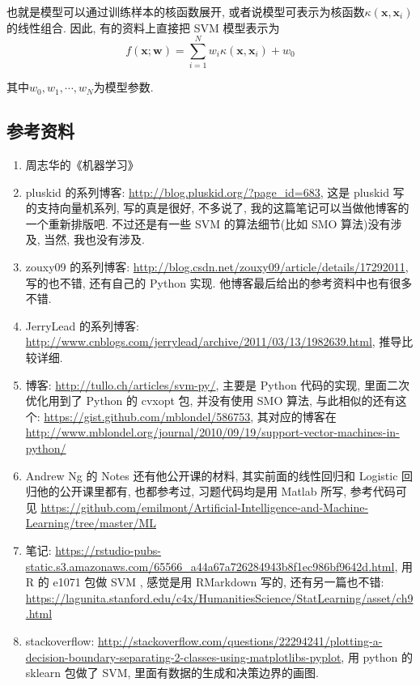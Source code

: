\documentclass[a4paper,UTF8]{ctexart}
\theoremstyle{plain} \newtheorem{theorem}{定理}[section]
\theoremstyle{plain} \newtheorem{definition}{定义}[section]
\theoremstyle{plain} \newtheorem{lemma}{引理}[section]
\theoremstyle{plain} \newtheorem{proposition}{命题}[section]
\theoremstyle{plain} \newtheorem{example}{例}
\theoremstyle{plain} \newtheorem{remark}{注}
\theoremstyle{plain} \newtheorem{corollary}{推论}[section]
\begin{document}
也就是模型可以通过训练样本的核函数展开, 或者说模型可表示为核函数$\kappa(\bm{x}, \bm{x}_i)$的线性组合. 因此, 有的资料上直接把 SVM 模型表示为
\begin{equation*}
f(\bm{x}; \bm{w}) = \sum_{i=1}^{N} w_i \kappa(\bm{x}, \bm{x}_i) + w_0 
\end{equation*}

其中$w_0, w_1, \cdots, w_N$为模型参数.





\subsection{参考资料}
\begin{enumerate}[(1)]
\item 周志华的《机器学习》

\item pluskid 的系列博客: \url{http://blog.pluskid.org/?page_id=683}, 这是 pluskid 写的支持向量机系列, 写的真是很好, 不多说了, 我的这篇笔记可以当做他博客的一个重新排版吧. 不过还是有一些 SVM 的算法细节(比如 SMO 算法)没有涉及, 当然, 我也没有涉及.

\item zouxy09 的系列博客: \url{http://blog.csdn.net/zouxy09/article/details/17292011}, 写的也不错, 还有自己的 Python 实现. 他博客最后给出的参考资料中也有很多不错.

\item JerryLead 的系列博客: \url{http://www.cnblogs.com/jerrylead/archive/2011/03/13/1982639.html}, 推导比较详细.

\item 博客: \url{http://tullo.ch/articles/svm-py/}, 主要是 Python 代码的实现, 里面二次优化用到了 Python 的 cvxopt 包, 并没有使用 SMO 算法, 与此相似的还有这个: \url{https://gist.github.com/mblondel/586753}, 其对应的博客在 \url{http://www.mblondel.org/journal/2010/09/19/support-vector-machines-in-python/}

\item Andrew Ng 的 Notes 还有他公开课的材料, 其实前面的线性回归和 Logistic 回归他的公开课里都有, 也都参考过, 习题代码均是用 Matlab 所写, 参考代码可见 \url{https://github.com/emilmont/Artificial-Intelligence-and-Machine-Learning/tree/master/ML}

\item 笔记: \url{https://rstudio-pubs-static.s3.amazonaws.com/65566_a44a67a726284943b8f1ec986bf9642d.html}, 用 R 的 e1071 包做 SVM , 感觉是用 RMarkdown 写的, 还有另一篇也不错: \url{https://lagunita.stanford.edu/c4x/HumanitiesScience/StatLearning/asset/ch9.html}

\item stackoverflow: \url{http://stackoverflow.com/questions/22294241/plotting-a-decision-boundary-separating-2-classes-using-matplotlibs-pyplot}, 用 python 的 sklearn 包做了 SVM, 里面有数据的生成和决策边界的画图.

\end{enumerate}
\end{document}
